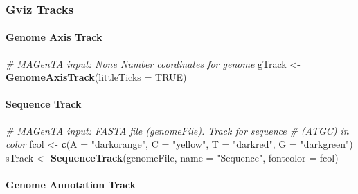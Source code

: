 \documentclass[11pt,]{article}
\newenvironment{Shaded}{\begin{snugshade}}{\end{snugshade}}
\newcommand{\KeywordTok}[1]{\textcolor[rgb]{0.13,0.29,0.53}{\textbf{{#1}}}}
\newcommand{\DataTypeTok}[1]{\textcolor[rgb]{0.13,0.29,0.53}{{#1}}}
\newcommand{\StringTok}[1]{\textcolor[rgb]{0.31,0.60,0.02}{{#1}}}
\newcommand{\CommentTok}[1]{\textcolor[rgb]{0.56,0.35,0.01}{\textit{{#1}}}}
\newcommand{\OtherTok}[1]{\textcolor[rgb]{0.56,0.35,0.01}{{#1}}}
\newcommand{\NormalTok}[1]{{#1}}
\let\oldparagraph\paragraph
\renewcommand{\paragraph}[1]{\oldparagraph{#1}\mbox{}}
\begin{document}
\subsubsection{Gviz Tracks}\label{gviz-tracks}

\paragraph{Genome Axis Track}\label{genome-axis-track}

\begin{Shaded}
\begin{Highlighting}[]
\CommentTok{# MAGenTA input: None Number coordinates for genome}
\NormalTok{gTrack <-}\StringTok{ }\KeywordTok{GenomeAxisTrack}\NormalTok{(}\DataTypeTok{littleTicks =} \OtherTok{TRUE}\NormalTok{)}
\end{Highlighting}
\end{Shaded}

\paragraph{Sequence Track}\label{sequence-track}

\begin{Shaded}
\begin{Highlighting}[]
\CommentTok{# MAGenTA input: FASTA file (genomeFile).  Track for sequence}
\CommentTok{# (ATGC) in color}
\NormalTok{fcol <-}\StringTok{ }\KeywordTok{c}\NormalTok{(}\DataTypeTok{A =} \StringTok{"darkorange"}\NormalTok{, }\DataTypeTok{C =} \StringTok{"yellow"}\NormalTok{, }\DataTypeTok{T =} \StringTok{"darkred"}\NormalTok{, }\DataTypeTok{G =} \StringTok{"darkgreen"}\NormalTok{)}
\NormalTok{sTrack <-}\StringTok{ }\KeywordTok{SequenceTrack}\NormalTok{(genomeFile, }\DataTypeTok{name =} \StringTok{"Sequence"}\NormalTok{, }\DataTypeTok{fontcolor =} \NormalTok{fcol)}
\end{Highlighting}
\end{Shaded}

\paragraph{Genome Annotation Track}\label{genome-annotation-track}
\end{document}
